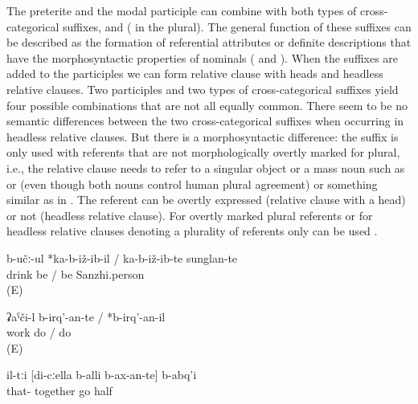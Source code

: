 The preterite and the modal participle can combine with both types of cross-categorical suffixes,  and  ( in the plural). The general function of these suffixes can be described as the formation of referential attributes or definite descriptions that have the morphosyntactic properties of nominals ( and ). When the suffixes are added to the participles we can form relative clause with heads and headless relative clauses. Two participles and two types of cross-categorical suffixes yield four possible combinations that are not all equally common. There seem to be no semantic differences between the two cross-categorical suffixes when occurring in headless relative clauses. But there is a morphosyntactic difference: the suffix  is only used with referents that are not morphologically overtly marked for plural, i.e., the relative clause needs to refer to a singular object or a mass noun such as   or   (even though both nouns control human plural agreement) or something similar as in . The referent can be overtly expressed (relative clause with a head) or not (headless relative clause). For overtly marked plural referents or for headless relative clauses denoting a plurality of referents only  can be used .
%
\begin{exe}
	\ex	\label{ex:the Sanzhi people who are sitting and drinking}
	\gll	b-učː-ul	*ka-b-iž-ib-il	/	ka-b-iž-ib-te	sunglan-te\\
		drink	be 	/	be	Sanzhi.person\\
	\glt	{} (E)

	\ex	\label{ex:the ones who are working PTCP}
	\gll	ʡaˁči-l	b-irq'-an-te	/	*b-irq'-an-il\\
		work	do	/	do\\
	\glt	{} (E)
	
		\ex	\label{ex:the half (of the people) who were going with me}
	\gll	il-tːi	[di-cːella	b-alli	b-ax-an-te]	b-abq'i\\
		that-		together	go 	half\\
	\glt	{}
\end{exe}


